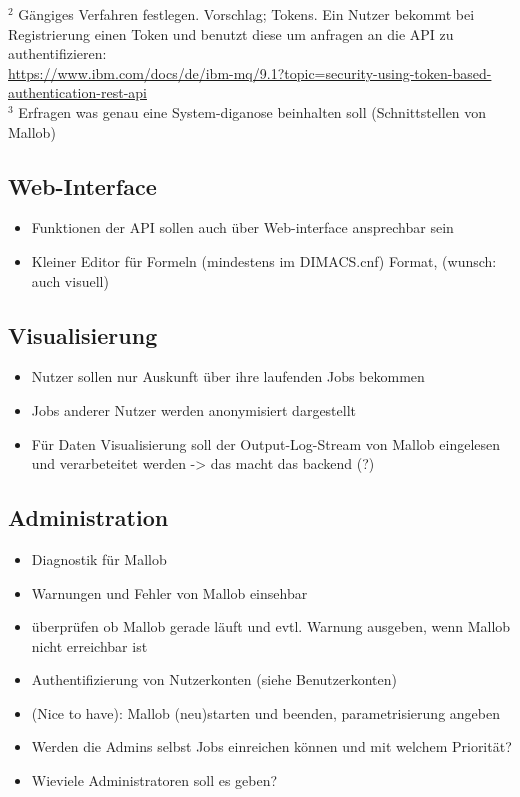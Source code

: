     
 $^2$ Gängiges Verfahren festlegen. Vorschlag; Tokens. Ein Nutzer bekommt bei Registrierung einen Token und benutzt diese um anfragen an die API zu authentifizieren:\\
\url{https://www.ibm.com/docs/de/ibm-mq/9.1?topic=security-using-token-based-authentication-rest-api} \\


$^3$ Erfragen was genau eine System-diganose beinhalten soll (Schnittstellen von Mallob)

\subsection{Web-Interface}

\begin{itemize}
    \item Funktionen der API sollen auch über Web-interface ansprechbar sein
    \item Kleiner Editor für Formeln (mindestens im DIMACS.cnf) Format, (wunsch: auch visuell)
\end{itemize}

\subsection{Visualisierung}

\begin{itemize}
    \item Nutzer sollen nur Auskunft über ihre laufenden Jobs bekommen 
    \item Jobs anderer Nutzer werden anonymisiert dargestellt
    \item Für Daten Visualisierung soll der Output-Log-Stream von Mallob eingelesen und verarbeteitet werden -> das macht das backend (?)
\end{itemize}


\subsection{Administration}
\begin{itemize}
    \item Diagnostik für Mallob
    \item Warnungen und Fehler von Mallob einsehbar
    \item überprüfen ob Mallob gerade läuft und evtl. Warnung ausgeben, wenn Mallob nicht erreichbar ist
    \item Authentifizierung von Nutzerkonten (siehe Benutzerkonten)
    
        
    \item (Nice to have): Mallob (neu)starten und beenden, parametrisierung angeben
    
    \item Werden die Admins selbst Jobs einreichen können und mit welchem Priorität?
    \item Wieviele Administratoren soll es geben?
\end{itemize}

